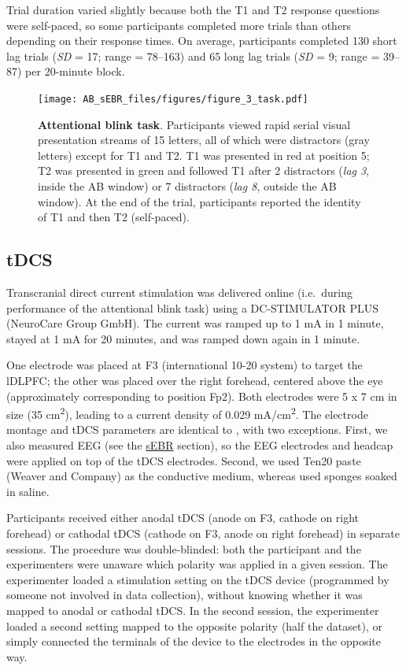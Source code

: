 \documentclass[11pt,]{memoir}
\begin{document}
Trial duration varied slightly because both the T1 and T2 response questions were self-paced, so some participants completed more trials than others depending on their response times. On average, participants completed 130 short lag trials (\emph{SD} = 17; range = 78--163) and 65 long lag trials (\emph{SD} = 9; range = 39--87) per 20-minute block.

\begin{figure}
\centering
\texttt{[image: AB\_sEBR\_files/figures/figure\_3\_task.pdf]}
\caption{\label{fig:AB-sEBR-fig-task}\textbf{Attentional blink task}. Participants viewed rapid serial visual presentation streams of 15 letters, all of which were distractors (gray letters) except for T1 and T2. T1 was presented in red at position 5; T2 was presented in green and followed T1 after 2 distractors (\emph{lag 3}, inside the AB window) or 7 distractors (\emph{lag 8}, outside the AB window). At the end of the trial, participants reported the identity of T1 and then T2 (self-paced).}
\end{figure}



\hypertarget{AB_sEBR-tDCS}{%
\subsection{tDCS}\label{AB_sEBR-tDCS}}

Transcranial direct current stimulation was delivered online (i.e.~during performance of the attentional blink task) using a DC-STIMULATOR PLUS (NeuroCare Group GmbH). The current was ramped up to 1 mA in 1 minute, stayed at 1 mA for 20 minutes, and was ramped down again in 1 minute.

One electrode was placed at F3 (international 10-20 system) to target the lDLPFC; the other was placed over the right forehead, centered above the eye (approximately corresponding to position Fp2). Both electrodes were 5 x 7 cm in size (35 cm\textsuperscript{2}), leading to a current density of 0.029 mA/cm\textsuperscript{2}. The electrode montage and tDCS parameters are identical to \textcite{London2015}, with two exceptions. First, we also measured EEG (see the \protect\hyperlink{AB_sEBR-sEBR}{sEBR} section), so the EEG electrodes and headcap were applied on top of the tDCS electrodes. Second, we used Ten20 paste (Weaver and Company) as the conductive medium, whereas \textcite{London2015} used sponges soaked in saline.

Participants received either anodal tDCS (anode on F3, cathode on right forehead) or cathodal tDCS (cathode on F3, anode on right forehead) in separate sessions. The procedure was double-blinded: both the participant and the experimenters were unaware which polarity was applied in a given session. The experimenter loaded a stimulation setting on the tDCS device (programmed by someone not involved in data collection), without knowing whether it was mapped to anodal or cathodal tDCS. In the second session, the experimenter loaded a second setting mapped to the opposite polarity (half the dataset), or simply connected the terminals of the device to the electrodes in the opposite way.
\end{document}
